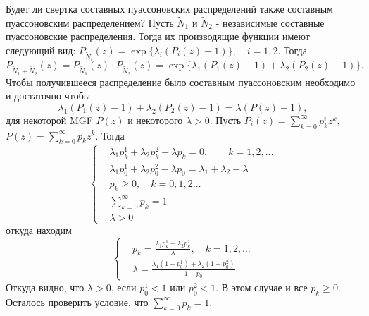     \problem{}
        Будет ли свертка составных пуассоновских распределений также составным пуассоновским распределением?
        \solution{}
            Пусть $\widetilde N_1$ и $\widetilde N_2$ - независимые составные пуассоновские распределения. Тогда их производящие функции имеют следующий вид: $P_{\widetilde N_i}(z) = \exp \{ \lambda_i (P_i(z) -1 ) \}, \quad i=1,2 $. Тогда
            \begin{equation*}
                P_{\widetilde N_1 + \widetilde N_2}(z) = P_{\widetilde N_1}(z) \cdot P_{\widetilde N_2}(z) = \exp \{\lambda_1 (P_1 (z) -1) + \lambda_2 (P_2(z) - 1) \}.
            \end{equation*}
            Чтобы получившееся распределение было составным пуассоновским необходимо и достаточно чтобы 
            \begin{equation*}
                \lambda_1 (P_1 (z) -1) + \lambda_2 (P_2(z) - 1) = \lambda ( P(z) - 1),
            \end{equation*}
            для некоторой MGF $P(z)$ и некоторого $\lambda>0$. Пусть $P_i(z) = \sum_{k=0}^\infty p_k^i z^k$, $P(z) = \sum_{k=0}^\infty p_k z^k$. Тогда
            \begin{equation} \label{system}
                \left\{\begin{aligned}
                    &\lambda_1p_k^1 + \lambda_2p_k^2 - \lambda p_k = 0,\qquad k=1,2,\dots \\
                    &\lambda_1p_0^1 + \lambda_2 p_0^2 - \lambda p_0 = \lambda_1 + \lambda_2 - \lambda\\
                    &p_k \geq 0, \quad k = 0,1,2 \dots\\
                    &\sum _{k=0}^\infty p_k = 1\\
                    &\lambda > 0
                \end{aligned}\right.
            \end{equation}
            откуда находим 
            \begin{equation*}
                \left\{\begin{aligned}
                    &p_k = \frac{\lambda_1p_k^1 + \lambda_2p_k^2}{\lambda}, \quad k = 1, 2, \dots\\
                    &\lambda = \frac{\lambda_1(1 - p_0^1) + \lambda_2 ( 1 - p_0^2)}{1 - p_0}.
                \end{aligned}\right.
            \end{equation*}
            Откуда видно, что $\lambda > 0$, если $p_0^1 < 1$ или $p_0^2 < 1$. В этом случае и все $p_k \geq 0$. Осталось проверить условие, что $\sum _{k=0}^\infty p_k = 1$. 
